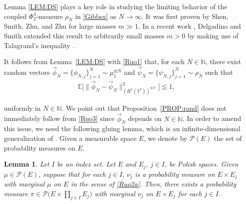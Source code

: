 \documentclass[letterpaper, 11pt,  reqno]{amsart}
\newtheorem{lemma}[theorem]{Lemma}
\newcommand{\1}{\hspace{0.5mm}\text{I}\hspace{0.2mm}}
\newcommand{\noi}{\noindent}
\newcommand{\T}{\mathbb{T}}
\newcommand{\N}{\mathbb{N}}
\newcommand{\E}{\mathbb{E}}
\newcommand{\les}{\lesssim}
\newcommand{\muN}{\mu_1^{\otimes N}}
\numberwithin{equation}{section}
\numberwithin{theorem}{section}
\begin{document}
Lemma \ref{LEM:DS} plays a key role
in studying 
the limiting behavior of  the coupled $\Phi^4_2$-measure
$\rho_N$ in \eqref{Gibbsx}
as $N \to \infty$.
It was first proven by Shen, Smith, Zhu, and Zhu
\cite[Theorem 5.11; see also (5.14)]{SSZZ}
for large masses $m \gg 1$.
In a recent work \cite{DS}, 
Delgadino and Smith 
extended this result to 
arbitrarily small masses $m > 0$
by making use of 
Talagrand's inequality
\cite{Tala, OV, FU}.




It follows from 
Lemma~\ref{LEM:DS}
with \eqref{Ruo1}
that, for each $N \in \N$,  there exist
  random vectors 
$\vec \phi_N =  \{\phi_{N, j}\}_{j = 1}^N \sim \muN$ 
and   $\vec \psi_N = \{\psi_{N, j}\}_{j = 1}^N \sim \rho_N$ such that
\begin{align}
\E \Big[ \| \vec \phi_N - \vec \psi_N \|_{(H^1 (\T^2))^{\otimes N}}^2 \Big] \les 1, 
\label{Ruo3}
\end{align}

\noi
uniformly in $N \in \N$.
We point out that 
Proposition~\ref{PROP:rand}
does not immediately follow
from \eqref{Ruo3}
since $\vec \phi_N$ depends on $N \in \N$.
In order to amend this issue, we need the following gluing lemma, which is an
infinite-dimensional generalization of \cite[Lemma~7.6]{Vill}. Given a measurable space $E$, we denote by $\mathcal{P} (E)$ the set of probability measures on $E$.



\begin{lemma}
\label{LEM:glue}
Let $I$ be an index set. Let $E$ and $E_j$,  $j \in I$,  be Polish spaces. 
Given
 $\mu \in \mathcal{P} (E)$, 
 suppose that for each $j \in I$,  
 $\nu_j$ is a probability measure on $E \times E_j$ with marginal $\mu$ on $E$
 in the sense of \eqref{Ruo2a}.
Then, there exists a probability measure $\pi \in \mathcal{P} \big( E \times \prod_{j \in I} E_j \big)$ with marginal $\nu_j$ on $E \times E_j$ for each $j \in I$.
\end{lemma}
\end{document}
